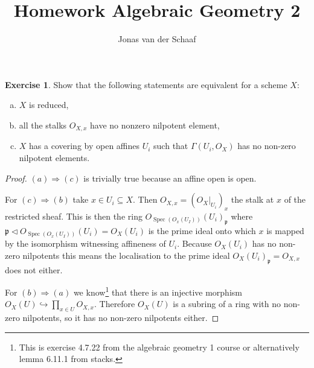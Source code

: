 \documentclass{article}
\title{Homework Algebraic Geometry 2}
\author{Jonas van der Schaaf}
\date{}
\newcommand{\primeid}{\mathfrak{p}}
\DeclareMathOperator{\spec}{Spec}
\newcommand{\ideal}{\triangleleft}
\theoremstyle{definition}
\newtheorem{question}{Exercise}
\begin{document}
\maketitle

\begin{question}
    Show that the following statements are equivalent for a scheme \(X\):

    \begin{enumerate}[(a)]
        \item \(X\) is reduced,
        \item all the stalks \(O_{X,x}\) have no nonzero nilpotent element,
        \item \(X\) has a covering by open affines \(U_{i}\) such that
              \(\Gamma(U_{i},O_{X})\) has no non-zero nilpotent elements.
    \end{enumerate}

    \begin{proof}
        \((a)\Rightarrow(c)\) is trivially true because an affine open is
        open.

        For \((c)\Rightarrow(b)\) take \(x\in U_{i}\subseteq X\). Then
        \(O_{X,x}=(O_{X}|_{U_{i}})_{x}\) the stalk at \(x\) of the restricted
        sheaf. This is then the ring
        \(O_{\spec(O_{x}(U_{I}))}(U_{i})_{\primeid}\) where \(\primeid\ideal
        O_{\spec(O_{x}(U_{I}))}(U_{i})=O_{X}(U_{i})\) is the prime ideal onto
        which \(x\) is mapped by the isomorphism witnessing affineness of
        \(U_{i}\). Because \(O_{X}(U_{i})\) has no non-zero nilpotents this
        means the localisation to the prime ideal
        \(O_{X}(U_{i})_{\primeid}=O_{X,x}\) does not either.

        For \((b)\Rightarrow(a)\) we know\footnote{This is exercise 4.7.22 from
            the algebraic geometry 1 course or alternatively lemma 6.11.1 from
            stacks.} that there is an injective morphism
        \(O_{X}(U)\hookrightarrow \prod_{x\in U}O_{X,x}\). Therefore
        \(O_{X}(U)\) is a subring of a ring with no non-zero nilpotents,
        so it has no non-zero nilpotents either.
    \end{proof}
\end{question}
\end{document}
